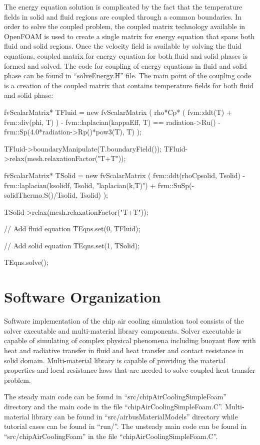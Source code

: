 The energy equation solution is complicated by the fact that the
temperature fields in solid and fluid regions are coupled through a
common boundaries. In order to solve the coupled problem, the coupled
matrix technology available in OpenFOAM is used to create a single
matrix for energy equation that spans both fluid and solid
regions. Once the velocity field is available by solving the fluid
equations, coupled matrix for energy equation for both fluid and solid
phases is formed and solved. The code for coupling of energy equations
in fluid and solid phase can be found in ``solveEnergy.H'' file. The
main point of the coupling code is a creation of the coupled matrix
that contains temperature fields for both fluid and solid phase:

\begin{verbQuoteSmall}
fvScalarMatrix* TFluid = new fvScalarMatrix
(
    rho*Cp*
    (
        fvm::ddt(T)
      + fvm::div(phi, T)
    )
  - fvm::laplacian(kappaEff, T)
    ==
    radiation->Ru()
  - fvm::Sp(4.0*radiation->Rp()*pow3(T), T)
);

TFluid->boundaryManipulate(T.boundaryField());
TFluid->relax(mesh.relaxationFactor("T+T"));

fvScalarMatrix* TSolid = new fvScalarMatrix
(
    fvm::ddt(rhoCpsolid, Tsolid)
  - fvm::laplacian(ksolidf, Tsolid, "laplacian(k,T)")
  + fvm::SuSp(-solidThermo.S()/Tsolid, Tsolid)
);

TSolid->relax(mesh.relaxationFactor("T+T"));

// Add fluid equation
TEqns.set(0, TFluid);

// Add solid equation
TEqns.set(1, TSolid);

TEqns.solve();
\end{verbQuoteSmall}

\section*{Software Organization}

Software implementation of the chip air cooling simulation tool
consists of the solver executable and multi-material library
components. Solver executable is capable of simulating of complex
physical phenomena including buoyant flow with heat and radiative
transfer in fluid and heat transfer and contact resistance in solid
domain. Multi-material library is capable of providing the material
properties and local resistance laws that are needed to solve coupled
heat transfer problem.

The steady main code can be found in ``src/chipAirCoolingSimpleFoam'' directory
and the main code in the file ``chipAirCoolingSimpleFoam.C''. Multi-material
library can be found in ``src/airbusMaterialModels'' directory while tutorial cases
can be found in ``run/''. The unsteady main code can be found in
``src/chipAirCoolingFoam'' in the file ``chipAirCoolingSimpleFoam.C''.


